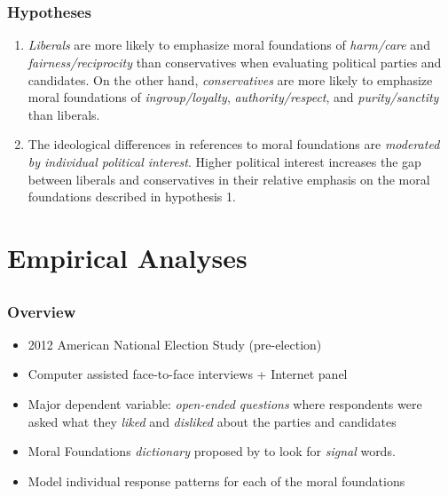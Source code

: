 \documentclass{beamer}
\begin{document}
\section{}
\subsection{}
\begin{frame}%
  \frametitle{Hypotheses}
  \begin{enumerate}
    \item \emph{Liberals} are more likely to emphasize moral foundations of \emph{harm/care} and \emph{fairness/reciprocity} than conservatives when evaluating political parties and candidates. On the other hand, \emph{conservatives} are more likely to emphasize moral foundations of \emph{ingroup/loyalty}, \emph{authority/respect}, and \emph{purity/sanctity} than liberals.
    \item The ideological differences in references to moral foundations are \emph{moderated by individual political interest}. Higher political interest increases the gap between liberals and conservatives in their relative emphasis on the moral foundations described in hypothesis 1.
  \end{enumerate}
\end{frame}

\section{Empirical Analyses}
\subsection{}
\begin{frame}%
  \frametitle{Overview}
  \begin{itemize}
    \item 2012 American National Election Study (pre-election)
    \item Computer assisted face-to-face interviews + Internet panel
    \item Major dependent variable: \emph{open-ended questions} where respondents were asked what they \emph{liked} and \emph{disliked} about the parties and candidates
    \item Moral Foundations \emph{dictionary} proposed by \citep{graham2009liberals} to look for \emph{signal} words.
    \item Model individual response patterns for each of the moral foundations
  \end{itemize}
\end{frame}
\end{document}
